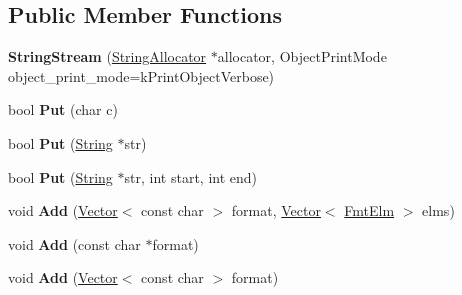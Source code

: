 \subsection*{Public Member Functions}
\begin{DoxyCompactItemize}
\item 
{\bfseries String\+Stream} (\hyperlink{classv8_1_1internal_1_1_string_allocator}{String\+Allocator} $\ast$allocator, Object\+Print\+Mode object\+\_\+print\+\_\+mode=k\+Print\+Object\+Verbose)\hypertarget{classv8_1_1internal_1_1_string_stream_a8c233bfed7b292234ab22574b34014a3}{}\label{classv8_1_1internal_1_1_string_stream_a8c233bfed7b292234ab22574b34014a3}

\item 
bool {\bfseries Put} (char c)\hypertarget{classv8_1_1internal_1_1_string_stream_a24a1a07729bf42969140ba16f3351920}{}\label{classv8_1_1internal_1_1_string_stream_a24a1a07729bf42969140ba16f3351920}

\item 
bool {\bfseries Put} (\hyperlink{classv8_1_1internal_1_1_string}{String} $\ast$str)\hypertarget{classv8_1_1internal_1_1_string_stream_a990d2b8c620877c62ec1d7e476f795a6}{}\label{classv8_1_1internal_1_1_string_stream_a990d2b8c620877c62ec1d7e476f795a6}

\item 
bool {\bfseries Put} (\hyperlink{classv8_1_1internal_1_1_string}{String} $\ast$str, int start, int end)\hypertarget{classv8_1_1internal_1_1_string_stream_a316ea0aceadd5222f8a2d85864e42088}{}\label{classv8_1_1internal_1_1_string_stream_a316ea0aceadd5222f8a2d85864e42088}

\item 
void {\bfseries Add} (\hyperlink{classv8_1_1internal_1_1_vector}{Vector}$<$ const char $>$ format, \hyperlink{classv8_1_1internal_1_1_vector}{Vector}$<$ \hyperlink{classv8_1_1internal_1_1_fmt_elm}{Fmt\+Elm} $>$ elms)\hypertarget{classv8_1_1internal_1_1_string_stream_a87c05ac7fcb5660845656511cff6b099}{}\label{classv8_1_1internal_1_1_string_stream_a87c05ac7fcb5660845656511cff6b099}

\item 
void {\bfseries Add} (const char $\ast$format)\hypertarget{classv8_1_1internal_1_1_string_stream_aa3882575a01cba886e200b75ad4225ca}{}\label{classv8_1_1internal_1_1_string_stream_aa3882575a01cba886e200b75ad4225ca}

\item 
void {\bfseries Add} (\hyperlink{classv8_1_1internal_1_1_vector}{Vector}$<$ const char $>$ format)\hypertarget{classv8_1_1internal_1_1_string_stream_a1575cac89edd5f8f004d2da49b3fb76b}{}\label{classv8_1_1internal_1_1_string_stream_a1575cac89edd5f8f004d2da49b3fb76b}


\end{DoxyCompactItemize}
